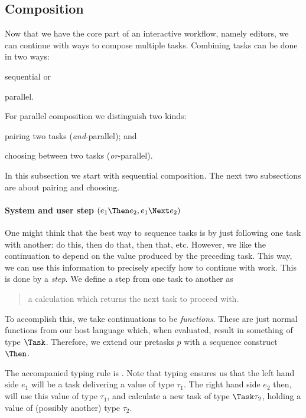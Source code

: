 \subsection{Composition}


Now that we have the core part of an interactive workflow,
namely editors,
we can continue with ways to compose multiple tasks.
Combining tasks can be done in two ways:
\begin{enumerate*}
  \item sequential or
  \item parallel.
\end{enumerate*}
For parallel composition we distinguish two kinds:
\begin{enumerate*}[(a)]
  \item pairing two tasks (\emph{and}-parallel); and
  \item choosing between two tasks (\emph{or}-parallel).
\end{enumerate*}
In this subsection we start with sequential composition.
The next two subsections are about pairing and choosing.



\paragraph{System and user step $(e_1 \Then e_2, e_1 \Next e_2)$}

One might think that the best way to sequence tasks is by just following one task with another:
do this, then do that, then that, etc.
However, we like the continuation to depend on the value produced by the preceding task.
This way, we can use this information to precisely specify how to continue with work.
This is done by a \emph{step}.
We define a step from one task to another as
\begin{quote}
  a calculation which returns the next task to proceed with.
\end{quote}

To accomplish this,
we take continuations to be \emph{functions}.
These are just normal functions from our host language which,
when evaluated, result in something of type $\Task$.
Therefore,
we extend our pretasks $p$ with a sequence construct $\Then$.

The accompanied typing rule is .
Note that typing ensures us that the left hand side $e_1$ will be a task delivering a value of type $\tau_1$.
The right hand side $e_2$ then, will use this value of type $\tau_1$,
and calculate a new task of type $\Task \tau_2$,
holding a value of (possibly another) type $\tau_2$.



